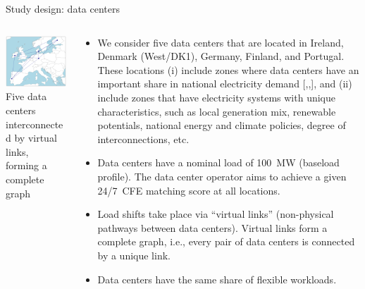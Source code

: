 \begin{frame}{Study design: data centers}
  
  {\footnotesize
  \begin{columns}[T]

  \begin{column}{7cm}
  \centering
  \vspace{0.5cm}
  \includegraphics[width=7cm]{images/map-DCs.png}
  {\scriptsize Five data centers interconnected by virtual links, \\ 
  forming a complete graph}
  \end{column}

  \begin{column}{8cm}
  \begin{itemize}
    \item We consider \alert{five data centers} that are located in Ireland, Denmark (West/DK1), Germany, Finland, and Portugal. These locations (i) include zones where data centers have an important share in national electricity demand [,,], and (ii) include zones that have electricity systems with unique characteristics, such as local generation mix, renewable potentials, national energy and climate policies, degree of interconnections, etc. 
    \item Data centers have a nominal load of \alert{100~MW} (baseload profile). The data center operator aims to achieve a given 24/7~CFE matching score \alert{at all locations}. 
    \item Load shifts take place via \enquote{virtual links} (non-physical pathways between data centers). Virtual links form a \alert{complete graph}, i.e., every pair of data centers is connected by a unique link.
    \item Data centers have the \alert{same share of flexible workloads}. 
  \end{itemize}

  \end{column}
  \end{columns}
  }

\end{frame}



